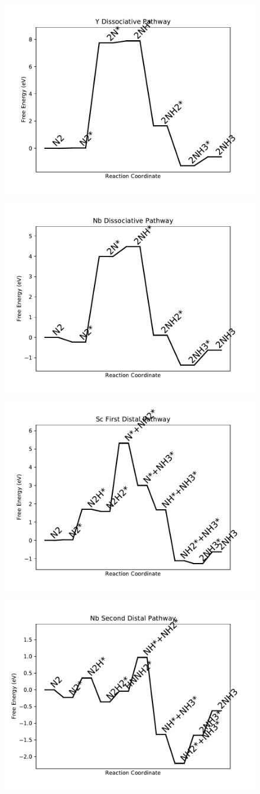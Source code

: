 \documentclass[journal=jacsat,manuscript=article]{achemso}
\begin{document}
\begin{figure}
\includegraphics[width=0.5\linewidth]{data/plots/Y_dissociative.pdf}
\label{fig:Y_dissociative}
\end{figure}

\begin{figure}
\includegraphics[width=0.5\linewidth]{data/plots/Nb_dissociative.pdf}
\label{fig:Nb_dissociative}
\end{figure}

\begin{figure}
\includegraphics[width=0.5\linewidth]{data/plots/Sc_distal_1.pdf}
\label{fig:Sc_distal_1}
\end{figure}

\begin{figure}
\includegraphics[width=0.5\linewidth]{data/plots/Nb_distal_2.pdf}
\label{fig:Nb_distal_2}
\end{figure}
\end{document}
